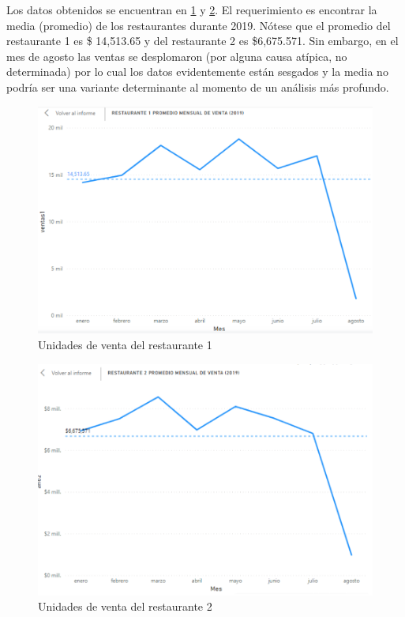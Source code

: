 \begin{enumerate}
		\begin{sol}
		Los datos obtenidos se encuentran en \ref{fig: 6} y \ref{fig: 7}. El requerimiento es encontrar la media (promedio) de los restaurantes durante 2019. Nótese que el promedio del restaurante 1 es \$ 14,513.65 y del restaurante 2 es \$6,675.571. Sin embargo, en el mes de agosto las ventas se desplomaron (por alguna causa atípica, no determinada) por lo cual los datos evidentemente están sesgados y la media no podría ser una variante determinante al momento de un análisis más profundo.  
\begin{figure}[H]
	\centering
	\includegraphics[scale=0.3]{Images/4}
	\caption{Unidades de venta del restaurante 1}
	\label{fig: 6}
\end{figure}
\begin{figure}[H]
	\centering
	\includegraphics[scale=0.3]{Images/4.1}
	\caption{Unidades de venta del restaurante 2}
	\label{fig: 7}
\end{figure}
	\end{sol}
	

\end{enumerate}

